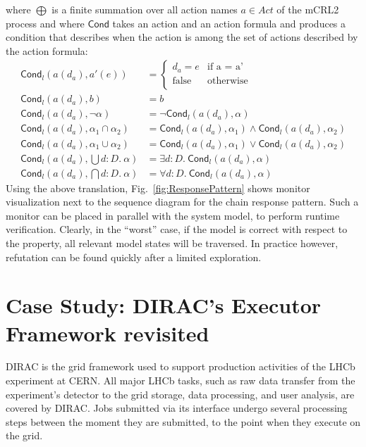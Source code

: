 \documentclass[letter]{llncs}
\newcommand{\TrA}{\ensuremath{\mathsf{Cond}}}
\begin{document}
where $\bigoplus$ is a finite summation over all action names
$a \in Act$ of the mCRL2 process and
where $\TrA$ takes an action and an action formula and produces a condition
that describes when the action is among the set of actions described by
the action formula:
\vspace{-5 pt}
\[
\begin{array}{ll}
\TrA_l(a(d_a),a'(e)) & = \left \{ \begin{array}{ll} d_a = e & \text{if a = a'}\\
                                  \text{false} & \text{otherwise}\\
                                  \end{array} \right .\\
\TrA_l(a(d_a),b) & = b \\
\TrA_l(a(d_a),\neg \alpha) & = \neg \TrA_l(a(d_a),\alpha) \\
\TrA_l(a(d_a),\alpha_1 \cap \alpha_2) & =
\TrA_l(a(d_a),\alpha_1) \wedge \TrA_l(a(d_a),\alpha_2) \\
\TrA_l(a(d_a),\alpha_1 \cup \alpha_2) & =
\TrA_l(a(d_a),\alpha_1) \vee \TrA_l(a(d_a),\alpha_2) \\
\TrA_l(a(d_a),\bigcup d{:}D.~\alpha) & = \exists d{:}D.~ \TrA_l(a(d_a),\alpha)\\
\TrA_l(a(d_a),\bigcap d{:}D.~\alpha) & = \forall d{:}D.~ \TrA_l(a(d_a),\alpha)
\end{array}
\]
Using the above translation, Fig.~\ref{fig:ResponsePattern} shows monitor visualization next to the sequence diagram for the chain response pattern.
Such a monitor can be placed in parallel with the system model,
to perform runtime verification. Clearly, in the ``worst'' case, if the model is correct with respect to the property,
all relevant model states will be traversed. In practice however, refutation can be found 
quickly after a limited exploration. 
\vspace{-8 pt}

\section{Case Study: DIRAC's Executor Framework revisited}
\vspace{-8 pt}

DIRAC \cite{DIRAC_CommGridSolution} is the grid framework used to support production activities of the LHCb experiment at CERN.
All major LHCb tasks, such as raw data transfer from the experiment's detector to the grid storage, data processing, and user analysis,
are covered by DIRAC. 
Jobs submitted via its interface undergo several processing steps between the moment they are submitted, 
to the point when they execute on the grid. 
\end{document}
